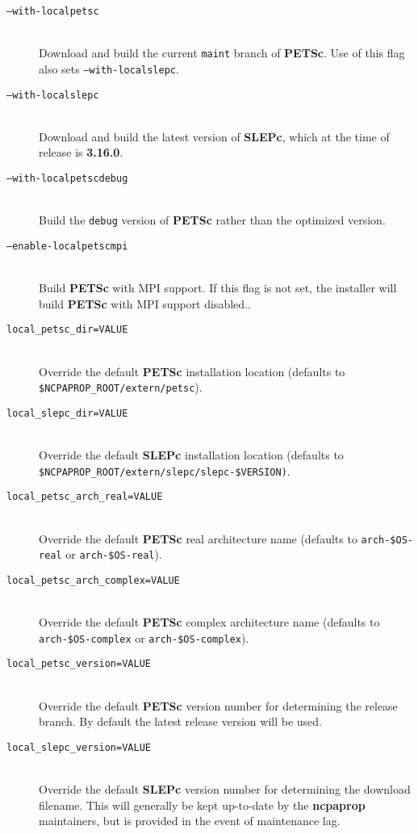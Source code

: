 \begin{description}
\item[\texttt{--with-localpetsc}]\hfill \\
\noindent
Download and build the current \texttt{maint} branch of \textbf{PETSc}.  Use of this flag also sets \texttt{--with-localslepc}.

\item[\texttt{--with-localslepc}]\hfill \\
\noindent
Download and build the latest version of \textbf{SLEPc}, which at the time of release is \textbf{3.16.0}.

\item[\texttt{--with-localpetscdebug}]\hfill \\
\noindent
Build the \texttt{debug} version of \textbf{PETSc} rather than the optimized version.

\item[\texttt{--enable-localpetscmpi}]\hfill \\
\noindent
Build \textbf{PETSc} with MPI support.  If this flag is not set, the installer will build \textbf{PETSc} with MPI support disabled..

\item[\texttt{local\_petsc\_dir=VALUE}]\hfill \\
\noindent
Override the default \textbf{PETSc} installation location (defaults to \texttt{\$NCPAPROP\_ROOT/extern/petsc}).

\item[\texttt{local\_slepc\_dir=VALUE}]\hfill \\
\noindent
Override the default \textbf{SLEPc} installation location (defaults to \texttt{\$NCPAPROP\_ROOT/extern/slepc/slepc-\$VERSION)}.

\item[\texttt{local\_petsc\_arch\_real=VALUE}]\hfill \\
\noindent
Override the default \textbf{PETSc} real architecture name (defaults to \texttt{arch-\$OS-real} or \texttt{arch-\$OS-real}).

\item[\texttt{local\_petsc\_arch\_complex=VALUE}]\hfill \\
\noindent
Override the default \textbf{PETSc} complex architecture name (defaults to \texttt{arch-\$OS-complex} or \texttt{arch-\$OS-complex}).

\item[\texttt{local\_petsc\_version=VALUE}]\hfill \\
\noindent
Override the default \textbf{PETSc} version number for determining the release branch.  By default the latest release version will be used.

\item[\texttt{local\_slepc\_version=VALUE}]\hfill \\
\noindent
Override the default \textbf{SLEPc} version number for determining the download filename.  This will generally be kept up-to-date by the \textbf{ncpaprop} maintainers, but is provided in the event of maintenance lag.
\end{description}

